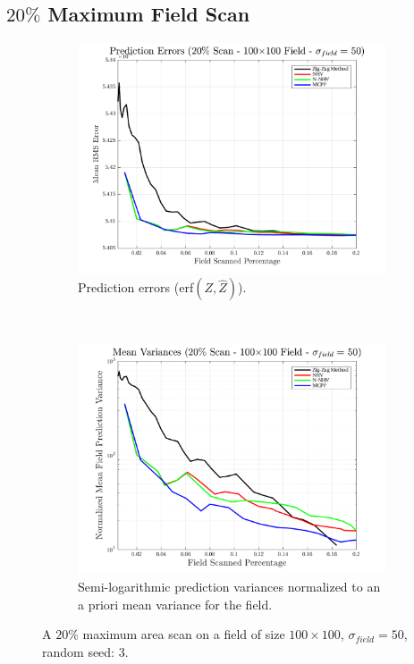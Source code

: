 \FloatBarrier
\clearpage
\subsection{$20\%$ Maximum Field Scan}
\begin{figure}[htb!]
    \centering
    \begin{subfigure}[t]{0.65\textwidth}
        \centering
        \includegraphics[width=\linewidth]{figures/hbresults/pred_errs_20p_100x100_sf_50_seed_3.png}
        \captionsetup{skip=0.20\baselineskip,size=footnotesize}
        \caption{Prediction errors (erf$(Z,\hat{Z})$).}
        \label{fig:prederrs_sigma50_p20_s3}
    \end{subfigure}%
    \\
    \begin{subfigure}[t]{0.65\textwidth}
        \centering
        \includegraphics[width=\linewidth]{figures/hbresults/vars_20p_100x100_sf_50_seed_3.png}
        \captionsetup{skip=0.20\baselineskip,size=footnotesize}
        \caption{Semi-logarithmic prediction variances normalized to an a priori mean variance for the field.}
        \label{fig:prederrs_sigma50_p20_s3}
    \end{subfigure}
    \captionsetup{skip=0.20\baselineskip}
    \caption{A $20\%$ maximum area scan on a field of size $100 \times 100$, $\sigma_{field} = 50$, random seed: 3.}
    \label{fig:sigma50_p20_s3}
\end{figure}

